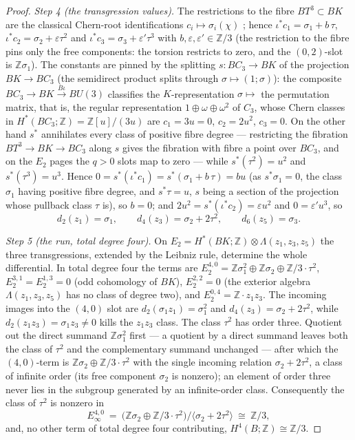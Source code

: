 \documentclass[11pt,a4paper]{article}
\begin{document}
\begin{proof}
\emph{Step 4 (the transgression values).} The restrictions to the fibre
$BT^3\subset BK$ are the classical Chern-root identifications
$c_i\mapsto\sigma_i(\chi)$ \cite{MilnorStasheff1974}; hence
$\iota^*c_1=\sigma_1+b\,\tau$, $\iota^*c_2=\sigma_2+\varepsilon\tau^2$
and $\iota^*c_3=\sigma_3+\varepsilon'\tau^3$ with
$b,\varepsilon,\varepsilon'\in\mathbb Z/3$ (the restriction to the fibre
pins only the free components: the torsion restricts to zero, and the
$(0,2)$-slot is $\mathbb Z\sigma_1$). The constants are pinned by the
splitting $s\colon BC_3\to BK$ of the projection $BK\to BC_3$ (the
semidirect product splits through $\sigma\mapsto(1;\sigma)$): the composite
$BC_3\to BK\overset{B\iota}{\to}BU(3)$ classifies the $K$-representation
$\sigma\mapsto$ the permutation matrix, that is, the regular representation
$1\oplus\omega\oplus\omega^2$ of $C_3$, whose Chern classes in
$H^*(BC_3;\mathbb Z)=\mathbb Z[u]/(3u)$ are $c_1=3u=0$, $c_2=2u^2$,
$c_3=0$. On the other hand $s^*$ annihilates every class of positive fibre
degree --- restricting the fibration $BT^3\to BK\to BC_3$ along $s$ gives
the fibration with fibre a point over $BC_3$, and on the $E_2$ pages the
$q>0$ slots map to zero --- while $s^*(\tau^2)=u^2$ and
$s^*(\tau^3)=u^3$. Hence $0=s^*(\iota^*c_1)=s^*(\sigma_1+b\,\tau)=bu$
(as $s^*\sigma_1=0$, the class $\sigma_1$ having positive fibre degree,
and $s^*\tau=u$, $s$ being a section of the projection whose pullback
class $\tau$ is), so $b=0$; and $2u^2=s^*(\iota^*c_2)=\varepsilon u^2$
and $0=\varepsilon'u^3$, so
\[
d_2(z_1)=\sigma_1,\qquad d_4(z_3)=\sigma_2+2\tau^2,\qquad
d_6(z_5)=\sigma_3 .
\]

\emph{Step 5 (the run, total degree four).} On
$E_2=H^*(BK;\mathbb Z)\otimes\Lambda(z_1,z_3,z_5)$ the three
transgressions, extended by the Leibniz rule, determine the whole
differential. In total degree four the terms are
$E_2^{4,0}=\mathbb Z\sigma_1^2\oplus\mathbb Z\sigma_2\oplus\mathbb
Z/3\cdot\tau^2$, $E_2^{3,1}=E_2^{1,3}=0$ (odd cohomology of $BK$),
$E_2^{2,2}=0$ (the exterior algebra $\Lambda(z_1,z_3,z_5)$ has no class of
degree two), and $E_2^{0,4}=\mathbb Z\cdot z_1z_3$. The incoming images into the $(4,0)$
slot are $d_2(\sigma_1z_1)=\sigma_1^2$ and $d_4(z_3)=\sigma_2+2\tau^2$,
while $d_2(z_1z_3)=\sigma_1z_3\ne0$ kills the $z_1z_3$ class. The class
$\tau^2$ has order three. Quotient out the direct summand
$\mathbb Z\sigma_1^2$ first --- a quotient by a direct summand leaves both
the class of $\tau^2$ and the complementary summand unchanged --- after
which the $(4,0)$-term is $\mathbb Z\sigma_2\oplus\mathbb Z/3\cdot\tau^2$
with the single incoming relation $\sigma_2+2\tau^2$, a class of infinite
order (its free component $\sigma_2$ is nonzero); an element of order
three never lies in the subgroup generated by an infinite-order class.
Consequently the class of
$\tau^2$ is nonzero in
\[
E_\infty^{4,0}\ =\ \bigl(\mathbb Z\sigma_2\oplus\mathbb Z/3\cdot\tau^2\bigr)
\big/\langle\sigma_2+2\tau^2\rangle\ \cong\ \mathbb Z/3,
\]
and, no other term of total degree four contributing,
$H^4(B;\mathbb Z)\cong\mathbb Z/3$.


\end{proof}
\end{document}
